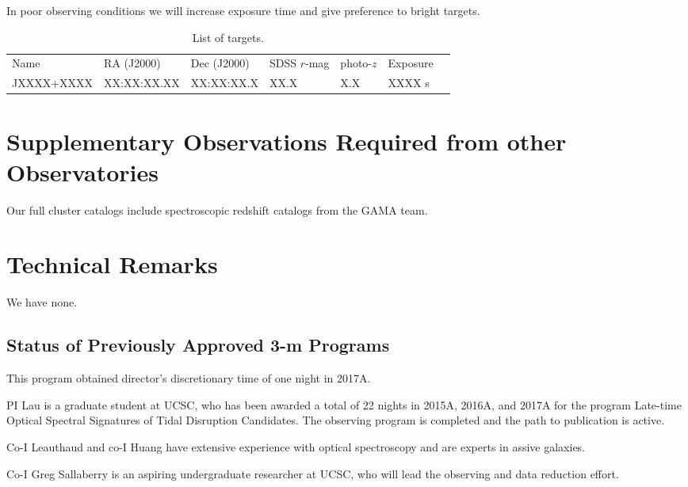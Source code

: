 \documentclass[letterpaper,12pt]{article}
\begin{document}
In poor observing conditions we will increase exposure time and give preference to bright targets. 

\begin{table}
\caption{List of targets.}
\begin{tabular}{lllllll}
\hline
Name & RA (J2000) & Dec (J2000) & SDSS $r$-mag & photo-$z$ & Exposure \\
JXXXX+XXXX & XX:XX:XX.XX & XX:XX:XX.X & XX.X & X.X & XXXX s & \\
\hline
\end{tabular}
\end{table}

\section{Supplementary Observations Required from other Observatories}

Our full cluster catalogs include spectroscopic redshift catalogs from the GAMA team. 

\section{Technical Remarks}

We have none. 

\subsection{Status of Previously Approved 3-m Programs}

This program obtained director's discretionary time of one night in 2017A.

PI Lau is a graduate student at UCSC, who has been awarded a total of 22 nights in 2015A, 2016A, 
and 2017A for the program Late-time Optical Spectral Signatures of Tidal Disruption Candidates. 
The observing program is completed and the path to publication is active. 

Co-I Leauthaud and co-I Huang have extensive experience with optical spectroscopy and are experts 
in assive galaxies. 

Co-I Greg Sallaberry is an aspiring undergraduate researcher at UCSC, who will lead the observing 
and data reduction effort. 
\end{document}
